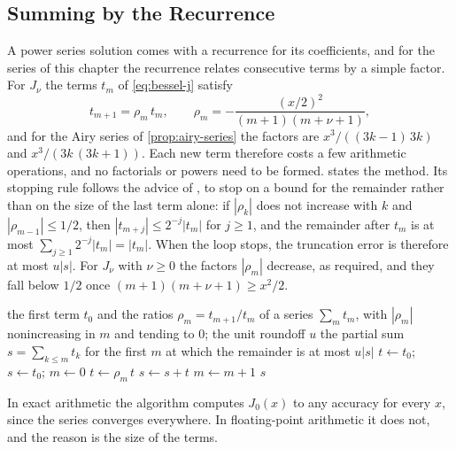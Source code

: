 \subsection{Summing by the Recurrence}

A power series solution comes with a recurrence for its coefficients, and for the series of this chapter the recurrence relates consecutive terms by a simple factor. For $J_\nu$ the terms $t_m$ of \eqref{eq:bessel-j} satisfy
\[
t_{m+1}=\rho_m\,t_m,\qquad\rho_m=-\frac{(x/2)^2}{(m+1)(m+\nu+1)},
\]
and for the Airy series of \cref{prop:airy-series} the factors are $x^3/((3k-1)\,3k)$ and $x^3/(3k\,(3k+1))$. Each new term therefore costs a few arithmetic operations, and no factorials or powers need to be formed.  states the method. Its stopping rule follows the advice of , to stop on a bound for the remainder rather than on the size of the last term alone: if $|\rho_k|$ does not increase with $k$ and $|\rho_{m-1}|\le1/2$, then $|t_{m+j}|\le2^{-j}|t_m|$ for $j\ge1$, and the remainder after $t_m$ is at most $\sum_{j\ge1}2^{-j}|t_m|=|t_m|$. When the loop stops, the truncation error is therefore at most $u|s|$. For $J_\nu$ with $\nu\ge0$ the factors $|\rho_m|$ decrease, as required, and they fall below $1/2$ once $(m+1)(m+\nu+1)\ge x^2/2$.

\begin{algorithm}
\begin{algorithmic}[1]
\Require the first term $t_0$ and the ratios $\rho_m=t_{m+1}/t_m$ of a series $\sum_mt_m$, with $|\rho_m|$ nonincreasing in $m$ and tending to $0$; the unit roundoff $u$
\Ensure the partial sum $s=\sum_{k\le m}t_k$ for the first $m$ at which the remainder is at most $u|s|$
\State $t\gets t_0$; $s\gets t_0$; $m\gets0$
\Repeat
  \State $t\gets\rho_m\,t$ 
  \State $s\gets s+t$
  \State $m\gets m+1$
\State \Return $s$
\end{algorithmic}
\caption{Summing a series whose terms are generated by a recurrence. The test on $\rho_{m-1}$ ensures that the remaining terms decrease at least geometrically, so that their sum is at most $|t|$; rounding errors are not taken into account.}
\label{alg:series-recurrence}
\end{algorithm}

In exact arithmetic the algorithm computes $J_0(x)$ to any accuracy for every $x$, since the series converges everywhere. In floating-point arithmetic it does not, and the reason is the size of the terms.

